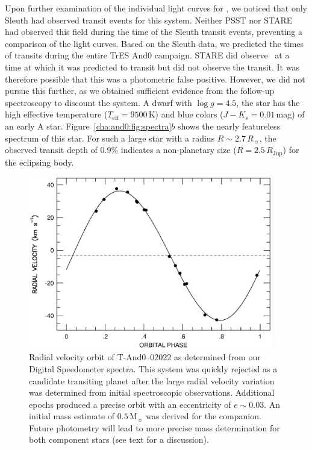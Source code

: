 Upon further examination of the individual light curves for \tTwo, we noticed that only Sleuth had observed transit events for this system. Neither PSST nor STARE had observed this field during the time of the Sleuth transit events, preventing a comparison of the light curves. Based on the Sleuth data, we predicted the times of transits during the entire TrES And0 campaign. STARE did observe \tTwo\ at a time at which it was predicted to transit but did not observe the transit. It was therefore possible that this was a photometric false positive. However, we did not pursue this further, as we obtained sufficient evidence from the follow-up spectroscopy to discount the system. A dwarf with $\log{g}=4.5$, the star has the high effective temperature ($T_{\mathrm{eff}}=9500$\,K) and blue colors ($J-K_{s}=0.01$\,mag) of an early A star. Figure~\ref{cha:and0:fig:spectra}$b$ shows the nearly featureless spectrum of this star. For such a large star with a radius $R\sim2.7\,R_{\sun}$, the observed transit depth of 0.9\% indicates a non-planetary size ($R=2.5\,R_{\mathrm{Jup}}$) for the eclipsing body.

\begin{figure}
\begin{center}
\includegraphics[width=0.95\textwidth]{2_f5}
\caption[Radial velocity orbit of \mbox{T-And0--02022}, an F+M eclipsing binary]{
Radial velocity orbit of \mbox{T-And0--02022} as determined from our Digital Speedometer spectra. This system was quickly rejected as a candidate transiting planet after the large radial velocity variation was determined from initial spectroscopic observations. Additional epochs produced a precise orbit with an eccentricity of $e\sim0.03$. An initial mass estimate of $0.5\,\mathrm{M}_{\sun}$ was derived for the companion. Future photometry will lead to more precise mass determination for both component stars (see text for a discussion).}\label{cha:and0:fig:rvorbit}
\end{center}
\end{figure}

